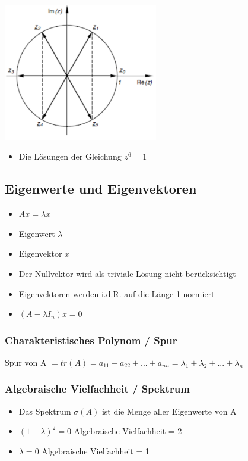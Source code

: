 \documentclass[8pt,a4paper]{scrartcl}
\begin{document}
\begin{multicols*}{3}
				\includegraphics[height=6cm]{./img/komplex2.png}
				\begin{itemize}\itemsep0pt	
					\item Die Lösungen der Gleichung $z^{6} = 1$
				\end{itemize}
										
			\subsection{Eigenwerte und Eigenvektoren}	
				\begin{itemize}\itemsep0pt				
					\item $Ax = \lambda x$
					\item Eigenwert $\lambda$
					\item Eigenvektor $x$
					\item Der Nullvektor wird als triviale Lösung nicht berücksichtigt
					\item Eigenvektoren werden i.d.R. auf die Länge 1 normiert
					\item $(A - \lambda I_{n})x = 0$
				\end{itemize}
			
			\subsubsection{Charakteristisches Polynom / Spur}
  			Spur von A $= tr(A)=a_{11} +a_{22} +...+a_{nn} =\lambda_{1} +\lambda_{2} +...+\lambda_{n}$

			\subsubsection{Algebraische Vielfachheit / Spektrum}
				\begin{itemize}\itemsep0pt		
					\item Das Spektrum $\sigma(A)$ ist die Menge aller Eigenwerte von A
					\item $(1-\lambda)^{2} = 0$ \qquad Algebraische Vielfachheit = 2
					\item $\lambda = 0$ \qquad \qquad \qquad Algebraische Vielfachheit = 1
				\end{itemize}
				

\end{multicols*}
\end{document}
